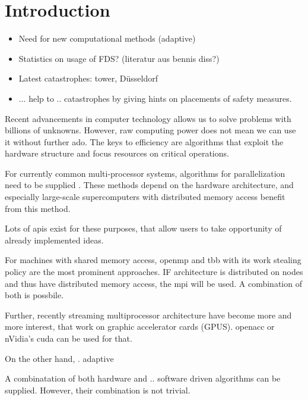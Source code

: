 \chapter{Introduction}
\label{ch:introduction}

\begin{itemize}
  \item Need for new computational methods (adaptive)
  \item Statistics on usage of FDS? (literatur aus bennis diss?)
  
  \item Latest catastrophes: tower, Düsseldorf
  \item ... help to .. catastrophes by giving hints on placements of safety measures.
\end{itemize}

Recent advancements in computer technology allows us to solve problems with billions of unknowns. However, raw computing power does not mean we can use it without further ado. The keys to efficiency are algorithms that exploit the hardware structure and focus resources on critical operations.

For currently common multi-processor systems, algorithms for parallelization need to be supplied . These methods depend on the hardware architecture, and especially large-scale supercomputers with distributed memory access benefit from this method.

Lots of \glspl{api} exist for these purposes, that allow users to take opportunity of already implemented ideas.

For machines with shared memory access, \glsdesc{openmp} \parencite{openmp50} and \glsdesc{tbb} \parencite{tbb2018} with its work stealing policy are the most prominent approaches. IF architecture is distributed on nodes and thus have distributed memory access, the \glsdesc{mpi} \parencite{mpi31} will be used. A combination of both is possbile.

Further, recently streaming multiprocessor architecture have become more and more interest, that work on graphic accelerator cards (GPUS). \glsdesc{openacc} \parencite{openacc27} or nVidia's \glsdesc{cuda} \parencite{cuda10} can be used for that.

On the other hand, . adaptive

A combinatation of both hardware and .. software driven algorithms can be supplied. However, their combination is not trivial. 

